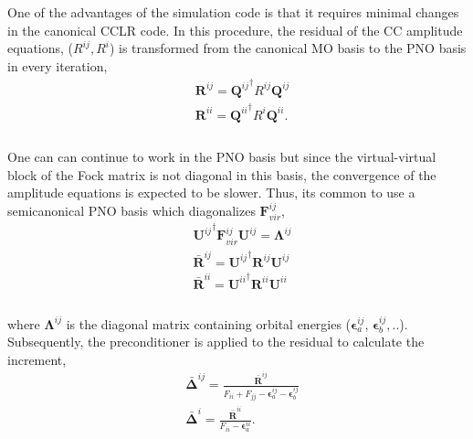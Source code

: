 \\\\
One of the advantages of the simulation code is that it requires minimal changes in the canonical CCLR code. In this
procedure, the residual of the CC amplitude equations, ($R^{ij}, R^{i}$) is transformed from the canonical MO basis to 
the PNO basis in every iteration,
\\
\begin{equation}
\begin{split}
&\bm{R}^{ij} = {\bm{Q}^{ij}}^{\dagger} R^{ij} \bm{Q}^{ij}\\
&\bm{R}^{ii} = {\bm{Q}^{ii}}^{\dagger} R^{i} \bm{Q}^{ii}.\\
\end{split}
\end{equation}
\\
One can can continue to work in the PNO basis but since the virtual-virtual block of the Fock matrix is 
not diagonal in this basis, the convergence of the amplitude equations is expected to be slower. Thus, its common to 
use a semicanonical PNO basis which diagonalizes $\bm{F}^{ij}_{vir}$,
\\
\begin{equation}
\begin{split}
&{\bm{U}^{ij}}^{\dagger} \bm{F}^{ij}_{vir} \bm{U}^{ij} = \bm{\Lambda}^{ij} \\
&\bm{\bar{R}}^{ij} = {\bm{U}^{ij}}^{\dagger} \bm{R}^{ij} \bm{U}^{ij}\\
&\bm{\bar{R}}^{ii} = {\bm{U}^{ii}}^{\dagger} \bm{R}^{ii} \bm{U}^{ii}\\
\end{split}
\end{equation}
\\
where $\bm{\Lambda}^{ij}$ is the diagonal matrix containing orbital energies ($\bm{\epsilon}^{ij}_{a}$, $\bm{\epsilon}^{ij}_{b}, ..$).
Subsequently, the preconditioner is applied to the residual to calculate the increment,
\\
\begin{equation}
\begin{split}
&{\bm{\bar{\Delta}}}^{ij} = \frac{\bm{\bar{R}}^{ij}}{F_{ii} + F_{jj} - \bm{\epsilon}^{ij}_{a} - \bm{\epsilon}^{ij}_{b}} \\
&{\bm{\bar{\Delta}}}^{i} = \frac{\bm{\bar{R}}^{ii}}{F_{ii} - \bm{\epsilon}^{ii}_{a}}.\\
\end{split}
\end{equation}
